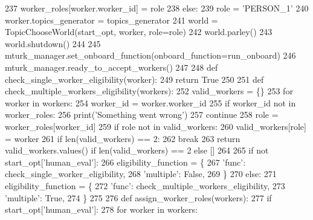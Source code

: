 \begin{DoxyCode}
{{{{237                 worker\_roles[worker.worker\_id] = role
238             \textcolor{keywordflow}{else}:
239                 role = \textcolor{stringliteral}{'PERSON\_1'}
240             worker.topics\_generator = topics\_generator
241             world = TopicChooseWorld(start\_opt, worker, role=role)
242             world.parley()
243             world.shutdown()
244 
245         mturk\_manager.set\_onboard\_function(onboard\_function=run\_onboard)
246         mturk\_manager.ready\_to\_accept\_workers()
247 
248         \textcolor{keyword}{def }check\_single\_worker\_eligibility(worker):
249             \textcolor{keywordflow}{return} \textcolor{keyword}{True}
250 
251         \textcolor{keyword}{def }check\_multiple\_workers\_eligibility(workers):
252             valid\_workers = \{\}
253             \textcolor{keywordflow}{for} worker \textcolor{keywordflow}{in} workers:
254                 worker\_id = worker.worker\_id
255                 \textcolor{keywordflow}{if} worker\_id \textcolor{keywordflow}{not} \textcolor{keywordflow}{in} worker\_roles:
256                     print(\textcolor{stringliteral}{'Something went wrong'})
257                     \textcolor{keywordflow}{continue}
258                 role = worker\_roles[worker\_id]
259                 \textcolor{keywordflow}{if} role \textcolor{keywordflow}{not} \textcolor{keywordflow}{in} valid\_workers:
260                     valid\_workers[role] = worker
261                 \textcolor{keywordflow}{if} len(valid\_workers) == 2:
262                     \textcolor{keywordflow}{break}
263             \textcolor{keywordflow}{return} valid\_workers.values() \textcolor{keywordflow}{if} len(valid\_workers) == 2 \textcolor{keywordflow}{else} []
264 
265         \textcolor{keywordflow}{if} \textcolor{keywordflow}{not} start\_opt[\textcolor{stringliteral}{'human\_eval'}]:
266             eligibility\_function = \{
267                 \textcolor{stringliteral}{'func'}: check\_single\_worker\_eligibility,
268                 \textcolor{stringliteral}{'multiple'}: \textcolor{keyword}{False},
269             \}
270         \textcolor{keywordflow}{else}:
271             eligibility\_function = \{
272                 \textcolor{stringliteral}{'func'}: check\_multiple\_workers\_eligibility,
273                 \textcolor{stringliteral}{'multiple'}: \textcolor{keyword}{True},
274             \}
275 
276         \textcolor{keyword}{def }assign\_worker\_roles(workers):
277             \textcolor{keywordflow}{if} start\_opt[\textcolor{stringliteral}{'human\_eval'}]:
278                 \textcolor{keywordflow}{for} worker \textcolor{keywordflow}{in} workers:
}}}}
\end{DoxyCode}
